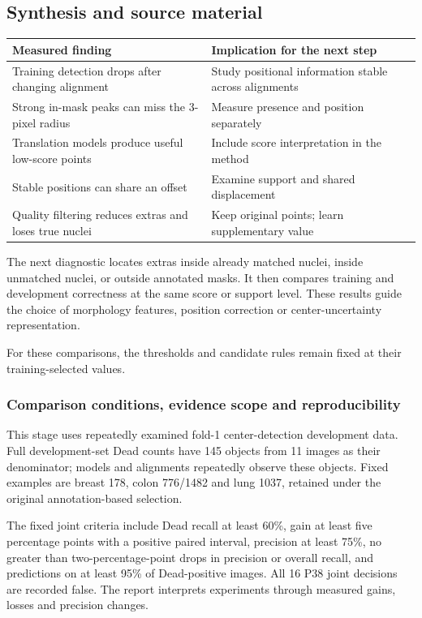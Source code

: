\documentclass[
  12pt,
]{article}
\newcounter{none} %
\begin{document}
\subsection{Synthesis and source material}\label{chapter42}
{\def\LTcaptype{none}
\begin{longtable}[]{@{}
  >{\raggedright\arraybackslash}p{}
  >{\raggedright\arraybackslash}p{}@{}}
\toprule\noalign{}
Measured finding & Implication for the next step\\
\midrule\noalign{}
\endhead
\bottomrule\noalign{}
\endlastfoot
Training detection drops after changing alignment & Study positional information stable across alignments\\
Strong in-mask peaks can miss the 3-pixel radius & Measure presence and position separately\\
Translation models produce useful low-score points & Include score interpretation in the method\\
Stable positions can share an offset & Examine support and shared displacement\\
Quality filtering reduces extras and loses true nuclei & Keep original points; learn supplementary value\\
\end{longtable}}
The next diagnostic locates extras inside already matched nuclei, inside unmatched nuclei, or outside annotated masks. It then compares training and development correctness at the same score or support level. These results guide the choice of morphology features, position correction or center-uncertainty representation.

For these comparisons, the thresholds and candidate rules remain fixed at their training-selected values.

\subsubsection{Comparison conditions, evidence scope and reproducibility}\label{chapter43}
This stage uses repeatedly examined fold-1 center-detection development data. Full development-set Dead counts have 145 objects from 11 images as their denominator; models and alignments repeatedly observe these objects. Fixed examples are breast 178, colon 776/1482 and lung 1037, retained under the original annotation-based selection.

The fixed joint criteria include Dead recall at least 60\%, gain at least five percentage points with a positive paired interval, precision at least 75\%, no greater than two-percentage-point drops in precision or overall recall, and predictions on at least 95\% of Dead-positive images. All 16 P38 joint decisions are recorded false. The report interprets experiments through measured gains, losses and precision changes.
\end{document}
